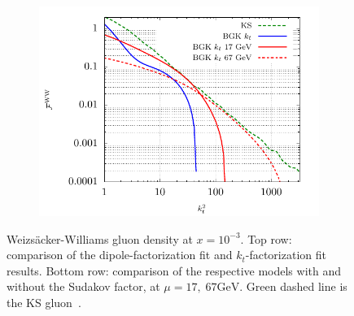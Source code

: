 \documentclass[a4,12pt]{article}
\begin{document}
\begin{figure}[t]
\begin{subfigure}{0.5\textwidth}
		\end{subfigure}
		\begin{subfigure}{0.5\textwidth}
			\includegraphics[width=\textwidth]{gnuplot/BGKWW2} 
		\end{subfigure}
		\caption{\footnotesize Weizs\"acker-Williams gluon density at $x=10^{-3}$. Top row: comparison of the dipole-factorization fit and $k_t$-factorization fit results. Bottom row: comparison of the respective models with and without the Sudakov factor, at $\mu=17,\;67 \mathrm{GeV}$. Green dashed line is the KS gluon~\cite{vanHameren:2021sqc}. }
		\label{fig:ww}
	\end{figure}
\end{document}
